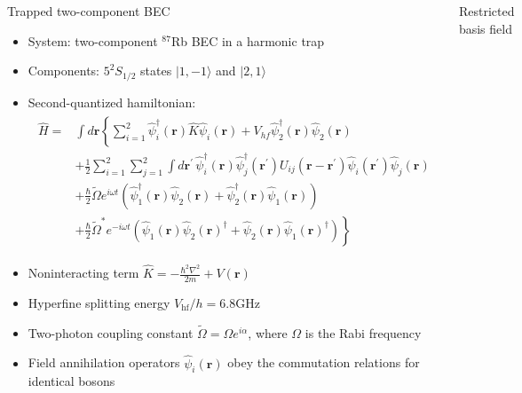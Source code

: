 \documentclass[final,hyperref={pdfpagelabels=false}]{beamer}
\newcommand{\Rb}{$^{87}$Rb }
\begin{document}
\begin{frame}
\begin{columns}
{\begin{block}{Trapped two-component BEC}
\begin{itemize}
	\item System: two-component \Rb BEC in a harmonic trap
	\item Components: $5^2S_{1/2}$ states $\vert1,-1\rangle$ and $\vert2,1\rangle$
	\item Second-quantized hamiltonian:
\begin{align*}
\begin{split}
\hat{H} = {} & \int d\mathbf{r} \left\{
	\sum\limits^2_{i=1} \hat{\psi}_i^\dagger(\mathbf{r}) \hat{K} \hat{\psi}_i(\mathbf{r}) +
	V_{hf} \hat{\psi}_2^\dagger(\mathbf{r}) \hat{\psi}_2(\mathbf{r}) \right. \\
& \left. + \frac{1}{2} \sum\limits^2_{i=1} \sum\limits^2_{j=1} \int d\mathbf{r}^\prime \,
	\hat{\psi}_i^\dagger (\mathbf{r}) \hat{\psi}_j^\dagger (\mathbf{r}^\prime)
	U_{ij}(\mathbf{r} - \mathbf{r}^\prime)
	\hat{\psi}_i(\mathbf{r}^\prime) \hat{\psi}_j(\mathbf{r}) \right. \\
& \left. + \frac{\hbar}{2} \tilde{\Omega} e^{i \omega t} \left(
		\hat{\psi}_1^\dagger(\mathbf{r}) \hat{\psi}_2(\mathbf{r}) +
		\hat{\psi}_2^\dagger(\mathbf{r}) \hat{\psi}_1(\mathbf{r})
	\right) \right. \\
& \left. + \frac{\hbar}{2} \tilde{\Omega}^* e^{-i \omega t} \left(
		\hat{\psi}_1(\mathbf{r}) \hat{\psi}_2(\mathbf{r})^\dagger +
		\hat{\psi}_2(\mathbf{r}) \hat{\psi}_1(\mathbf{r})^\dagger
	\right)
\right\}
\end{split}
\end{align*}
	\item Noninteracting term $\hat{K} = - \frac{\hbar^2 \nabla^2}{2 m} + V(\mathbf{r})$
	\item Hyperfine splitting energy $V_{\textrm{hf}} / h = 6.8 \textrm{GHz}$
	\item Two-photon coupling constant $\tilde{\Omega} = \Omega e^{i \alpha}$,
		where $\Omega$ is the Rabi frequency
	\item Field annihilation operators $\hat{\psi}_i (\mathbf{r})$ obey the commutation relations for identical bosons
\end{itemize}

\end{block}

\begin{block}{Restricted basis field}


\end{block}}
\end{columns}
\end{frame}
\end{document}
